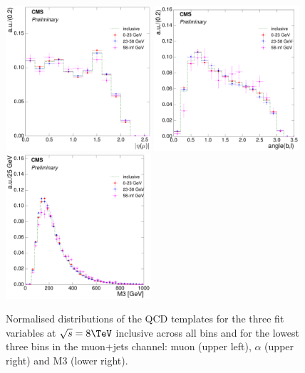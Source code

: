 \begin{figure}[hbtp]
    \centering
     \includegraphics[width=0.48\textwidth]{Chapters/04_Analysis/04b_XSections/images/8TeV/fit_variables/muon/MT/muon_absolute_eta/qcd/MT_muon_absolute_eta_0orMoreBtag_QCD_template_comparison.pdf}\hfill
     \includegraphics[width=0.48\textwidth]{Chapters/04_Analysis/04b_XSections/images/8TeV/fit_variables/muon/MT/angle_bl/qcd/MT_angle_bl_1orMoreBtag_QCD_template_comparison.pdf}\\
     \includegraphics[width=0.48\textwidth]{Chapters/04_Analysis/04b_XSections/images/8TeV/fit_variables/muon/MT/M3/qcd/MT_M3_0orMoreBtag_QCD_template_comparison.pdf}\\
	 \caption{Normalised distributions of the QCD templates for the three fit variables at $\sqrt{s}=8\TeV$
	 inclusive across all \mt bins and for the lowest three \mt bins in the muon+jets channel: muon \abseta
	 (upper left), $\alpha$ (upper right) and M3 (lower right).}
     \label{fig:MT_fit_variable_qcd_comparisons_muon_8TeV}
\end{figure}

